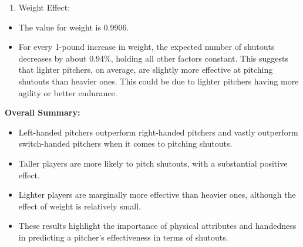 \documentclass[
]{article}
\providecommand{\tightlist}{%
  \setlength{\itemsep}{0pt}\setlength{\parskip}{0pt}}
\begin{document}
\begin{enumerate}
\def\labelenumi{\arabic{enumi}.}
\setcounter{enumi}{3}
\tightlist
\item
  Weight Effect:
\end{enumerate}

\begin{itemize}
\item
  The value for weight is 0.9906.
\item
  For every 1-pound increase in weight, the expected number of shutouts
  decreases by about 0.94\%, holding all other factors constant. This
  suggests that lighter pitchers, on average, are slightly more
  effective at pitching shutouts than heavier ones. This could be due to
  lighter pitchers having more agility or better endurance.
\end{itemize}

\textbf{Overall Summary:}

\begin{itemize}
\item
  Left-handed pitchers outperform right-handed pitchers and vastly
  outperform switch-handed pitchers when it comes to pitching shutouts.
\item
  Taller players are more likely to pitch shutouts, with a substantial
  positive effect.
\item
  Lighter players are marginally more effective than heavier ones,
  although the effect of weight is relatively small.
\item
  These results highlight the importance of physical attributes and
  handedness in predicting a pitcher's effectiveness in terms of
  shutouts.
\end{itemize}
\end{document}
